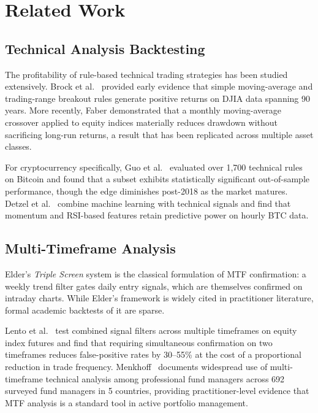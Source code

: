 \documentclass[conference]{IEEEtran}
\begin{document}
\section{Related Work}
\label{sec:related}

\subsection{Technical Analysis Backtesting}

The profitability of rule-based technical trading strategies
has been studied extensively. Brock et al.\ \cite{brock1992simple}
provided early evidence that simple moving-average and
trading-range breakout rules generate positive returns on
DJIA data spanning 90 years. More recently, Faber
\cite{faber2007quantitative} demonstrated that a monthly
moving-average crossover applied to equity indices
materially reduces drawdown without sacrificing long-run
returns, a result that has been replicated across multiple
asset classes.

For cryptocurrency specifically, Guo et al.\
\cite{guo2018bitcoin} evaluated over 1,700 technical rules
on Bitcoin and found that a subset exhibits statistically
significant out-of-sample performance, though the edge
diminishes post-2018 as the market matures. Detzel et al.\
\cite{detzel2023learning} combine machine learning with
technical signals and find that momentum and RSI-based
features retain predictive power on hourly BTC data.

\subsection{Multi-Timeframe Analysis}

Elder's \emph{Triple Screen} system
\cite{elder1993trading} is the classical formulation of
MTF confirmation: a weekly trend filter gates daily entry
signals, which are themselves confirmed on intraday
charts. While Elder's framework is widely cited in
practitioner literature, formal academic backtests of
it are sparse.

Lento et al.\ \cite{lento2007combined} test combined
signal filters across multiple timeframes on equity index
futures and find that requiring simultaneous confirmation
on two timeframes reduces false-positive rates by
30--55\% at the cost of a proportional reduction in trade
frequency. Menkhoff\ \cite{menkhoff2010technical}
documents widespread use of multi-timeframe technical
analysis among professional fund managers across 692
surveyed fund managers in 5 countries, providing
practitioner-level evidence that MTF analysis is a
standard tool in active portfolio management.
\end{document}
